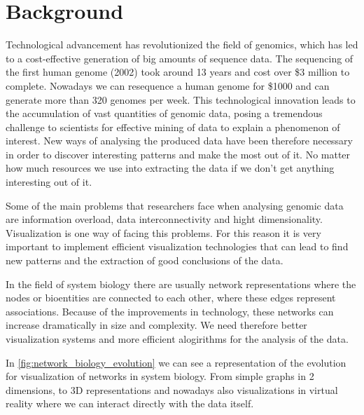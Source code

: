 \section{Background}
Technological advancement has revolutionized the field of genomics, which has led to a cost-effective generation of big amounts of sequence data. The sequencing of the first human genome (2002) took around 13 years and cost over \$3 million to complete. Nowadays we can resequence a human genome for \$1000 and can generate more than 320 genomes per week\cite{big_biological_impacts_bd}. This technological innovation leads to the accumulation of vast quantities of genomic data, posing a tremendous challenge to scientists for effective mining of data to explain a phenomenon of interest\cite{zhang_paciorkowski_craig_cui_2019}. New ways of analysing the produced data have been therefore necessary in order to discover interesting patterns  and make the most out of it. No matter how much resources we use into extracting the data if we don't get anything interesting out of it.

Some of the main problems that researchers face when analysing genomic data are information overload, data interconnectivity and hight dimensionality. Visualization is one way of facing this problems. For this reason it is very important to implement efficient visualization technologies that can lead to find new patterns and the extraction of good conclusions of the data.

In the field of system biology there are usually network representations where the nodes or bioentities are connected to each other, where these edges represent associations. Because of the improvements in technology, these networks can increase dramatically in size and complexity. We need therefore better visualization systems and more efficient alogirithms for the analysis of the data.

In \ref{fig:network_biology_evolution} we can see a representation of the evolution for visualization of networks in system biology. From simple graphs in 2 dimensions, to 3D representations and nowadays also visualizations in virtual reality where we can interact directly with the data itself.

